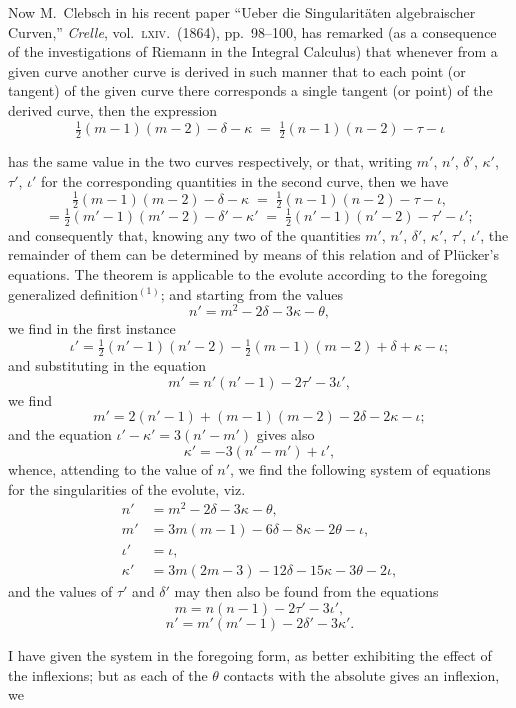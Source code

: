 \documentclass[11pt]{article}
\begin{document}
Now M.~Clebsch in his recent paper ``Ueber die Singularit\"aten algebraischer Curven,'' \emph{Crelle}, vol.~\textsc{lxiv}.\ (1864), pp.\ 98--100, has remarked (as a consequence of the investigations of Riemann in the Integral Calculus) that whenever from a given curve another curve is derived in such manner that to each point (or tangent) of the given curve there corresponds a single tangent (or point) of the derived curve, then the expression
\[
\tfrac{1}{2}(m-1)(m-2) - \delta - \kappa \;=\; \tfrac{1}{2}(n-1)(n-2) - \tau - \iota
\]

\newpage

\noindent has the same value in the two curves respectively, or that, writing $m'$, $n'$, $\delta'$, $\kappa'$, $\tau'$, $\iota'$ for the corresponding quantities in the second curve, then we have
\[
\tfrac{1}{2}(m-1)(m-2) - \delta - \kappa \;=\; \tfrac{1}{2}(n-1)(n-2) - \tau - \iota,
\]
\[
=\tfrac{1}{2}(m'-1)(m'-2) - \delta' - \kappa' \;=\; \tfrac{1}{2}(n'-1)(n'-2) - \tau' - \iota';
\]
and consequently that, knowing any two of the quantities $m'$, $n'$, $\delta'$, $\kappa'$, $\tau'$, $\iota'$, the remainder of them can be determined by means of this relation and of Pl\"ucker's equations. The theorem is applicable to the evolute according to the foregoing generalized definition${}^{(1)}$; and starting from the values
\[
n' = m^{2} - 2\delta - 3\kappa - \theta,
\]
we find in the first instance
\[
\iota' = \tfrac{1}{2}(n'-1)(n'-2) - \tfrac{1}{2}(m-1)(m-2) + \delta + \kappa - \iota;
\]
and substituting in the equation
\[
m' = n'(n'-1) - 2\tau' - 3\iota',
\]
we find
\[
m' = 2(n'-1) + (m-1)(m-2) - 2\delta - 2\kappa - \iota;
\]
and the equation $\iota' - \kappa' = 3(n'-m')$ gives also
\[
\kappa' = -3(n'-m') + \iota',
\]
whence, attending to the value of $n'$, we find the following system of equations for the singularities of the evolute, viz.
\begin{align*}
n' &= m^{2} - 2\delta - 3\kappa - \theta,\\
m' &= 3m(m-1) - 6\delta - 8\kappa - 2\theta - \iota,\\
\iota' &= \iota,\\
\kappa' &= 3m(2m-3) - 12\delta - 15\kappa - 3\theta - 2\iota,
\end{align*}
and the values of $\tau'$ and $\delta'$ may then also be found from the equations
\[
m = n(n-1) - 2\tau' - 3\iota',
\]
\[
n' = m'(m'-1) - 2\delta' - 3\kappa'.
\]

I have given the system in the foregoing form, as better exhibiting the effect of the inflexions; but as each of the $\theta$ contacts with the absolute gives an inflexion, we
\end{document}
